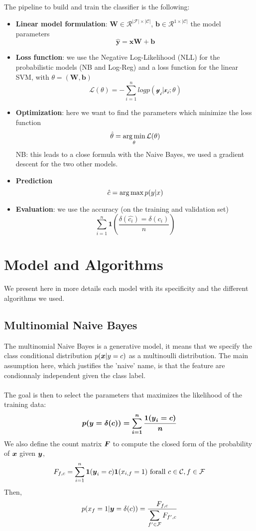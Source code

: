 \documentclass[11pt]{article}
\begin{document}
\noindent The pipeline to build and train the classifier is the following:
\begin{itemize}
	\item \textbf{Linear model formulation}: $\mathbf{W} \in \mathcal{R}^{|\mathcal{F}| \times |\mathcal{C}|}$, $\mathbf{b} \in \mathcal{R}^{1 \times |\mathcal{C}|}$ the model parameters
	\[ \mathbf{\hat{y}} = \mathbf{xW} + \mathbf{b} \]
	\item \textbf{Loss function}: we use the Negative Log-Likelihood (NLL) for the probabilistic models (NB and Log-Reg) and a loss function for the linear SVM, with $ \theta = (\mathbf{W}, \mathbf{b})$
	\[\mathcal{L}(\theta) = - \sum_{i=1}^{n} log p(\mathcal{y_i}| \mathcal{x_i}; \theta) \]
	\item \textbf{Optimization}: here we want to find the parameters which minimize the loss function
	\[ \hat{\theta} = \argmin_{\theta}{\mathcal{L}(\theta)} \]
	NB: this leads to a close formula with the Naive Bayes, we used a gradient descent for the two other models.
	\item \textbf{Prediction}
	\[\hat{c} = \argmax{p(y|x)} \]
	\item \textbf{Evaluation}: we use the accuracy (on the training and validation set)
	\[ \sum_{i = 1}^{n} \mathbf{1}(\frac{\delta(\hat{c_i}) = \delta(c_i)}{n}) \]
\end{itemize}



\section{Model and Algorithms}

We present here in more details each model with its specificity and the different algorithms we used.

\subsection{Multinomial Naive Bayes}

The multinomial Naive Bayes is a generative model, it means that we specify the class conditional distribution $p(\boldsymbol{x} | y=c)$ as a multinoulli distribution. The main assumption here, which  justifies the 'naive' name, is that the feature are condionnaly independent given the class label.\\ \\
The goal is then to select the parameters that maximizes the likelihood of the training data:
    \[p(\boldsymbol{y} = \boldmath{\delta(c)}) = \sum_{i = 1}^n \frac{1(\boldsymbol{y}_i = c)}{n}\]
We also define the count matrix $\boldsymbol{F}$ to compute the closed form of the probability of $\boldsymbol{x}$ given $\boldsymbol{y}$,
\[F_{f,c} = \sum_{i = 1}^n \mathbf{1}(\boldsymbol{y}_i = c) \mathbf{1}(x_{i, f} = 1) \mathrm{\ for all\ } c\in \mathcal{C}, f\in \mathcal{F}\] 
Then,
      \[p(x_f = 1 | \boldsymbol{y}=\boldmath{\delta(c)}) = \frac{F_{f, c}}{\displaystyle \sum_{f' \in \mathcal{F}} F_{f',c}}  \]
\end{document}
